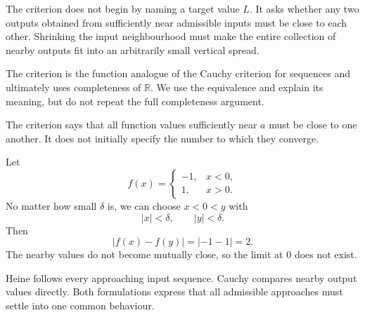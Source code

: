 \begin{interpretationbox}
The criterion does not begin by naming a target value $L$. It asks whether any two outputs obtained from sufficiently near admissible inputs must be close to each other. Shrinking the input neighbourhood must make the entire collection of nearby outputs fit into an arbitrarily small vertical spread.
\end{interpretationbox}

\begin{remarkbox}
The criterion is the function analogue of the Cauchy criterion for sequences and ultimately uses completeness of $\mathbb R$. We use the equivalence and explain its meaning, but do not repeat the full completeness argument.
\end{remarkbox}

The criterion says that all function values sufficiently near $a$ must be close to one another. It does not initially specify the number to which they converge.

\begin{examplebox}
Let
\[
f(x)=
\begin{cases}
-1,&x<0,\\
1,&x>0.
\end{cases}
\]
No matter how small $\delta$ is, we can choose $x<0<y$ with
\[
|x|<\delta,
\qquad
|y|<\delta.
\]
Then
\[
|f(x)-f(y)|=|-1-1|=2.
\]
The nearby values do not become mutually close, so the limit at $0$ does not exist.
\end{examplebox}

\begin{interpretationbox}
Heine follows every approaching input sequence. Cauchy compares nearby output values directly. Both formulations express that all admissible approaches must settle into one common behaviour.
\end{interpretationbox}
